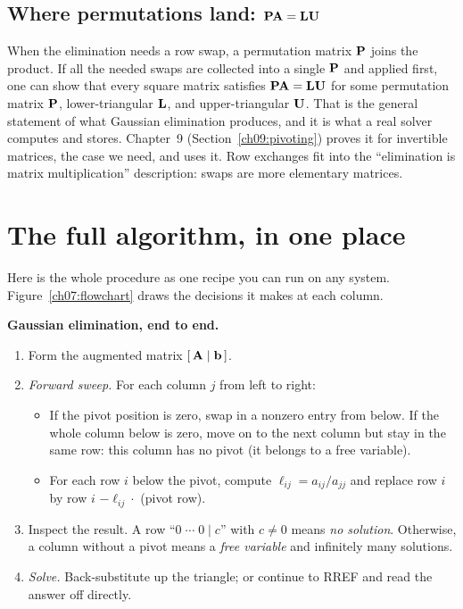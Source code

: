 \subsection{Where permutations land: $\mathbf{PA}=\mathbf{LU}$}

When the elimination needs a row swap, a permutation matrix $\mathbf{P}$ joins the
product. If all the needed swaps are collected into a single $\mathbf{P}$ and applied
first, one can show that every square matrix satisfies $\mathbf{PA}=\mathbf{LU}$ for
some permutation matrix $\mathbf{P}$, lower-triangular $\mathbf{L}$, and upper-triangular
$\mathbf{U}$. That is the general statement of what Gaussian elimination
produces, and it is what a real solver computes and stores. Chapter~9
(Section~\ref{ch09:pivoting}) proves it for invertible matrices, the case we
need, and uses it. Row exchanges
fit into the ``elimination is matrix multiplication'' description: swaps
are more elementary matrices.

\section{The full algorithm, in one place}

Here is the whole procedure as one recipe you can run on any system.
Figure~\ref{ch07:flowchart} draws the decisions it makes at each column.

\begin{focusbox}
\textbf{Gaussian elimination, end to end.}
\begin{enumerate}
  \item Form the augmented matrix $[\,\mathbf{A}\mid\mathbf{b}\,]$.
  \item \emph{Forward sweep.} For each column $j$ from left to right:
  \begin{itemize}
    \item If the pivot position is zero, swap in a nonzero entry from
    below. If the whole column below is zero, move on to the next column but stay
    in the same row: this column has no
    pivot (it belongs to a free variable).
    \item For each row $i$ below the pivot, compute $\ell_{ij}=a_{ij}/a_{jj}$ and
    replace row $i$ by row $i$ $-\ell_{ij}\cdot$ (pivot row).
  \end{itemize}
  \item Inspect the result. A row ``$0\;\cdots\;0\mid c$'' with $c\neq 0$ means
  \emph{no solution}. Otherwise, a column without a pivot means a \emph{free
  variable} and infinitely many solutions.
  \item \emph{Solve.} Back-substitute up the triangle; or continue to RREF and
  read the answer off directly.
\end{enumerate}
\end{focusbox}

